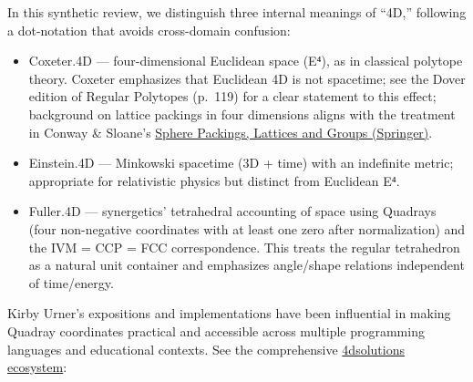 \documentclass[
  10pt,
]{article}
\providecommand{\tightlist}{%
  \setlength{\itemsep}{0pt}\setlength{\parskip}{0pt}}
\begin{document}
In this synthetic review, we distinguish three internal meanings of
``4D,'' following a dot-notation that avoids cross-domain confusion:

\begin{itemize}
\tightlist
\item
  Coxeter.4D --- four-dimensional Euclidean space (E⁴), as in classical
  polytope theory. Coxeter emphasizes that Euclidean 4D is not
  spacetime; see the Dover edition of Regular Polytopes (p.~119) for a
  clear statement to this effect; background on lattice packings in four
  dimensions aligns with the treatment in Conway \& Sloane's
  \href{https://link.springer.com/book/10.1007/978-1-4757-6568-7}{Sphere
  Packings, Lattices and Groups (Springer)}.
\item
  Einstein.4D --- Minkowski spacetime (3D + time) with an indefinite
  metric; appropriate for relativistic physics but distinct from
  Euclidean E⁴.
\item
  Fuller.4D --- synergetics' tetrahedral accounting of space using
  Quadrays (four non-negative coordinates with at least one zero after
  normalization) and the IVM = CCP = FCC correspondence. This treats the
  regular tetrahedron as a natural unit container and emphasizes
  angle/shape relations independent of time/energy.
\end{itemize}

Kirby Urner's expositions and implementations have been influential in
making Quadray coordinates practical and accessible across multiple
programming languages and educational contexts. See the comprehensive
\href{https://github.com/4dsolutions}{4dsolutions ecosystem}:
\end{document}
